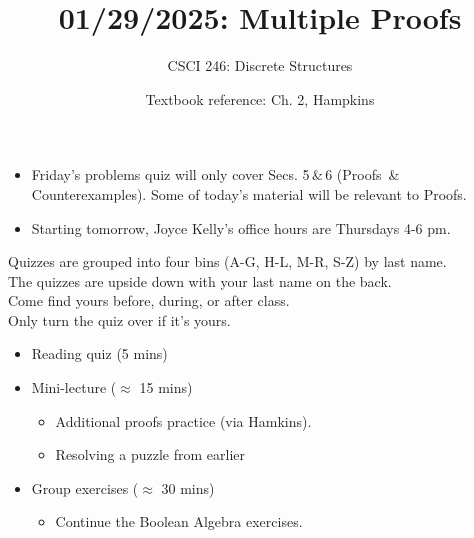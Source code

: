 \documentclass[10pt]{beamer}
\begin{document}






\title{01/29/2025: Multiple Proofs}
\author{CSCI 246: Discrete Structures}
\date{Textbook reference: Ch. 2, Hampkins}

\begin{frame}
    \titlepage 
\end{frame}


\begin{frame}
\footnotesize 
\begin{myredbox}[title=Brightspace announcement highlights]
\begin{itemize}
\item Friday's problems quiz will only cover Secs. 5\,\&\,6 (Proofs \,\&\, Counterexamples). Some of today's material will be relevant to Proofs. 
\item Starting tomorrow,  Joyce Kelly's office hours are Thursdays 4-6 pm.
\end{itemize}
\end{myredbox}
\vfill 

\begin{mygreenbox}[title=New quiz return method]
Quizzes are grouped into four bins (A-G, H-L, M-R, S-Z) by last name. \\
The quizzes are upside down with your last name on the back. \\
Come find yours before, during, or after class. \\
Only turn the quiz over if it's yours.
\end{mygreenbox} 
\vfill 

\begin{myyellowbox}[title=Today's Agenda]

\begin{itemize}
	\item Reading quiz  (5 mins)
	\item Mini-lecture ($\approx$ 15 mins)
	\begin{itemize}
	\footnotesize 
	\item Additional proofs practice (via Hamkins).
	\item Resolving a puzzle	 from earlier
	\end{itemize}
	\item Group exercises ($\approx$ 30 mins)
	\begin{itemize}
	\footnotesize 
	\item Continue the Boolean Algebra exercises.
	\end{itemize}
\end{itemize}

\end{myyellowbox}
\vfill 


\end{frame}
\end{document}

